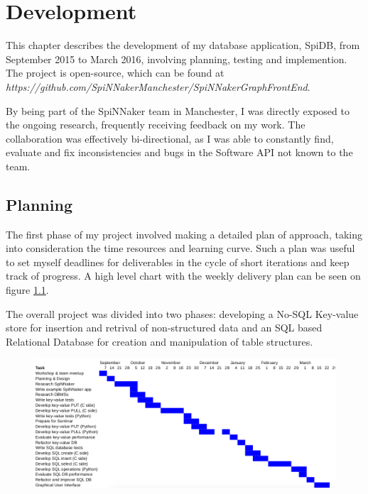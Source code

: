 \chapter{Development}

This chapter describes the development of my database application, SpiDB, from September 2015 to March 2016, involving planning, testing and implemention. The project is open-source, which can be found at
\textit{https://github.com/SpiNNakerManchester/SpiNNakerGraphFrontEnd}.

By being part of the SpiNNaker team in Manchester, I was directly exposed to the ongoing research, frequently receiving feedback on my work. The collaboration was effectively bi-directional, as I was able to constantly find, evaluate and fix inconsistencies and bugs in the Software API not known to the team.

\section{Planning}
The first phase of my project involved making a detailed plan of approach, taking into consideration the time resources and learning curve. Such a plan was useful to set myself deadlines for deliverables in the cycle of short iterations and keep track of progress. A high level chart with the weekly delivery plan can be seen on figure \ref{fig:plan}.

The overall project was divided into two phases: developing a No-SQL Key-value store for insertion and retrival of non-structured data and an SQL based Relational Database for creation and manipulation of table structures. 

\begin{figure}
\center
  \includegraphics[width=1.3\linewidth, natwidth=950, natheight=410]{images/plan.png}
  \label{fig:plan}
\end{figure}

